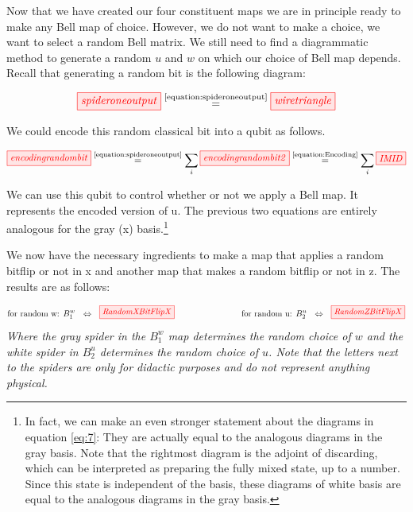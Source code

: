 \documentclass[]{article}
\newcommand{\equaltext}[1]{\ensuremath{\stackrel{\text{#1}}{=}}}
\begin{document}
Now that we have created our four constituent maps we are in principle ready to make any Bell map of choice. However, we do not want to make a choice, we want to select a random Bell matrix. We still need to find a diagrammatic method to generate a random $u$ and $w$ on which our choice of Bell map depends. Recall that generating a random bit is the following diagram: 

\begin{equation}
	\tikzfig{spideroneoutput} \equaltext{\ref{equation:spideroneoutput}} \tikzfig{wiretriangle}
\end{equation}

We could encode this random classical bit into a qubit as follows.

\begin{equation}
	\label{eq:7}
	\tikzfig{encodingrandombit} \equaltext{\ref{equation:spideroneoutput}} \sum\limits_{i} \tikzfig{encodingrandombit2} \equaltext{\ref{equation:Encoding}} \sum\limits_{i} \tikzfig{IMID}
\end{equation}

We can use this qubit to control whether or not we apply a Bell map. It represents the encoded version of u. The previous two equations are entirely analogous for the gray (x) basis.\footnote{In fact, we can make an even stronger statement about the diagrams in equation \ref{eq:7}: They are actually equal to the analogous diagrams in the gray basis. Note that the rightmost diagram is the adjoint of discarding, which can be interpreted as preparing the fully mixed state, up to a number. Since this state is independent of the basis, these diagrams of white basis are equal to the analogous diagrams in the gray basis.}

We now have the necessary ingredients to make a map that applies a random bitflip or not in x and another map that makes a random bitflip or not in z. The results are as follows:

\begin{equation}
	\label{equation:twodiagrammaticpauli's}
	\text{for random w: }B_1^w ~~  \Leftrightarrow ~~ \tikzfig{RandomXBitFlipX} ~~~~~~~~~~~~~~~~~~~~~~~~ \text{for random u: } B_2^u ~~ \Leftrightarrow ~~ \tikzfig{RandomZBitFlipX}
\end{equation}
\textit{Where the gray spider in the $B_1^w$ map determines the random choice of $w$ and the white spider in $B_2^u$ determines the random choice of $u$. Note that the letters next to the spiders are only for didactic purposes and do not represent anything physical.}
\end{document}
